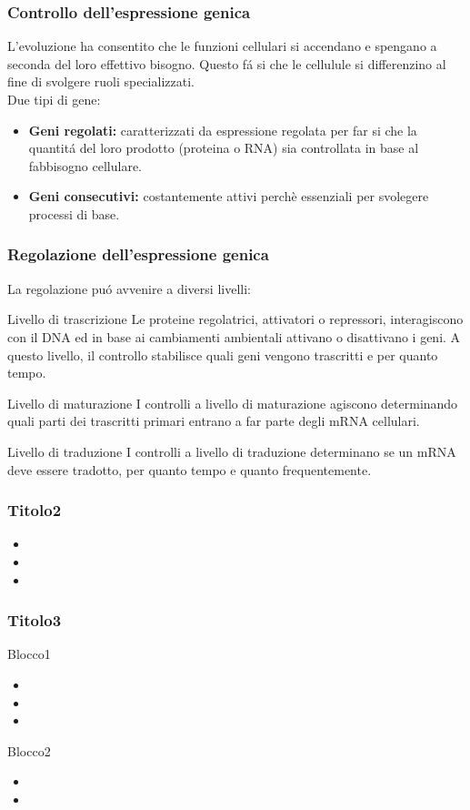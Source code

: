 \documentclass[hyperref={pdfpagelabels=false}]{beamer}
\begin{document}
\begin{frame}\frametitle{Controllo dell'espressione genica}
L'evoluzione ha consentito che le funzioni cellulari si accendano e spengano a seconda del loro effettivo bisogno. Questo f\'a si che le cellulule si differenzino al fine di svolgere ruoli specializzati.
\\
Due tipi di gene:
\begin{itemize}
\item \textbf{Geni regolati:}  caratterizzati da espressione regolata per far si che la quantit\'a del loro prodotto (proteina o RNA) sia controllata in base al fabbisogno cellulare.
\item \textbf{Geni consecutivi:} costantemente attivi perchè essenziali per svolegere processi di base.
\end{itemize}
\end{frame}
\begin{frame}\frametitle{Regolazione dell'espressione genica}
La regolazione pu\'o avvenire a diversi livelli:
\begin{block}{Livello di trascrizione}
Le proteine regolatrici, attivatori o repressori, interagiscono con il DNA ed in base ai cambiamenti ambientali attivano o disattivano i geni. A questo livello, il controllo stabilisce quali geni vengono trascritti e per quanto tempo.
\end{block}
\begin{block}{Livello di maturazione}
I controlli a livello di maturazione agiscono determinando quali parti dei trascritti primari entrano a far parte degli mRNA cellulari.
\end{block}
\begin{block}{Livello di traduzione}
I controlli a livello di traduzione determinano se un mRNA deve essere tradotto, per quanto tempo e quanto frequentemente.
\end{block}
\end{frame}

\begin{frame}\frametitle{Titolo2}
\begin{itemize}
\item 
\item 
\item 
\end{itemize}
\end{frame}

\begin{frame}\frametitle{Titolo3}
\begin{block}{Blocco1}
\begin{itemize}
\item 
\item 
\item 
\end{itemize}
\end{block}
\begin{exampleblock}{Blocco2}
\begin{itemize}
\item 
\item 
\end{itemize}
\end{exampleblock}
\bigskip
\bigskip
\bigskip
\end{frame}
\end{document}
